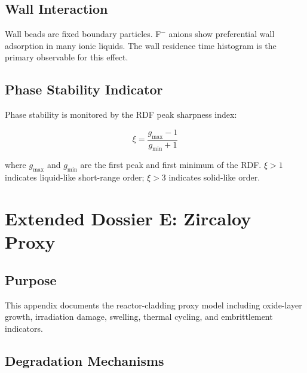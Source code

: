 \documentclass[12pt]{article}
\begin{document}
\subsection{Wall Interaction}

Wall beads are fixed boundary particles.
F$^-$ anions show preferential wall adsorption in many ionic liquids.
The wall residence time histogram is the primary observable for this effect.

\subsection{Phase Stability Indicator}

Phase stability is monitored by the RDF peak sharpness index:

\begin{equation}
	\xi = \frac{g_{\mathrm{max}} - 1}{g_{\mathrm{min}} + 1}
\end{equation}

where $g_{\mathrm{max}}$ and $g_{\mathrm{min}}$ are the first peak and first
minimum of the RDF.
$\xi > 1$ indicates liquid-like short-range order;
$\xi > 3$ indicates solid-like order.

\section{Extended Dossier E: Zircaloy Proxy}
\label{app:zircaloy}

\subsection{Purpose}

This appendix documents the reactor-cladding proxy model including oxide-layer
growth, irradiation damage, swelling, thermal cycling, and embrittlement
indicators.

\subsection{Degradation Mechanisms}
\end{document}
